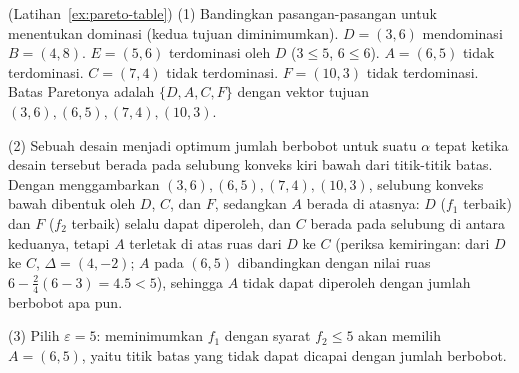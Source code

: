 \begin{solution}(Latihan~\ref{ex:pareto-table})
(1) Bandingkan pasangan-pasangan untuk menentukan dominasi (kedua tujuan diminimumkan). $D = (3,6)$ mendominasi $B = (4,8)$. $E = (5,6)$ terdominasi oleh $D$ ($3 \leq 5$, $6 \leq 6$). $A = (6,5)$ tidak terdominasi. $C = (7,4)$ tidak terdominasi. $F = (10,3)$ tidak terdominasi. Batas Paretonya adalah $\{D, A, C, F\}$ dengan vektor tujuan $(3,6), (6,5), (7,4), (10,3)$.

(2) Sebuah desain menjadi optimum jumlah berbobot untuk suatu $\alpha$ tepat ketika desain tersebut berada pada selubung konveks kiri bawah dari titik-titik batas. Dengan menggambarkan $(3,6), (6,5), (7,4), (10,3)$, selubung konveks bawah dibentuk oleh $D$, $C$, dan $F$, sedangkan $A$ berada di atasnya: $D$ ($f_1$ terbaik) dan $F$ ($f_2$ terbaik) selalu dapat diperoleh, dan $C$ berada pada selubung di antara keduanya, tetapi $A$ terletak di atas ruas dari $D$ ke $C$ (periksa kemiringan: dari $D$ ke $C$, $\Delta = (4, -2)$; $A$ pada $(6,5)$ dibandingkan dengan nilai ruas $6 - \tfrac{2}{4}(6-3) = 4.5 < 5$), sehingga $A$ tidak dapat diperoleh dengan jumlah berbobot apa pun.

(3) Pilih $\varepsilon = 5$: meminimumkan $f_1$ dengan syarat $f_2 \leq 5$ akan memilih $A = (6,5)$, yaitu titik batas yang tidak dapat dicapai dengan jumlah berbobot.
\end{solution}

